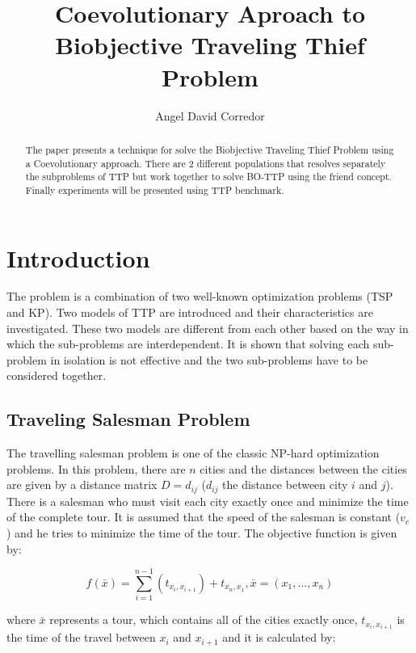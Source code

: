 \documentclass[twocolumn]{IEEEtran}
\begin{document}
\title{Coevolutionary Aproach to Biobjective Traveling Thief Problem}
\author{Angel David Corredor}
\date{}
\maketitle

\begin{abstract}
    The paper presents a technique for solve the Biobjective Traveling Thief Problem using a Coevolutionary approach.
    There are 2 different populations that resolves separately the subproblems of TTP but work together
    to solve BO-TTP using the friend concept. Finally experiments will be presented using TTP benchmark.  
\end{abstract}

\section{Introduction}

The problem is a combination of two well-known optimization problems (TSP and KP).
Two models of TTP are introduced and their characteristics are investigated. 
These two models are different from each other based on the way in which the sub-problems are
interdependent. It is shown that solving each sub-problem in isolation is not effective and the 
two sub-problems have to be considered together.

\subsection{Traveling Salesman Problem}

The travelling salesman problem is one of the classic NP-hard optimization problems.
In this problem, there are $n$ cities and the distances between the cities are given by a 
distance matrix $D=d_{ij}$ ($d_{ij}$ the distance between city $i$ and $j$).
There is a salesman who must visit each city exactly once and minimize the time of the complete tour.
It is assumed that the speed of the salesman is constant ($v_c$) and he tries to minimize
the time of the tour. 
The objective function is given by:

\begin{equation}
    f(\bar{x}) =
    \sum_{i=1}^{n-1} (t_{x_i,x_{i+1}})
    + t_{x_n,x_1},
    \bar{x}=(x_1,...,x_n)
\end{equation}

where $\bar{x}$ represents a tour, which contains all of the cities exactly once, 
$t_{x_i,x_{i+1}}$ is the time of the travel between $x_i$ and $x_{i+1}$ and it is calculated by:
\end{document}
